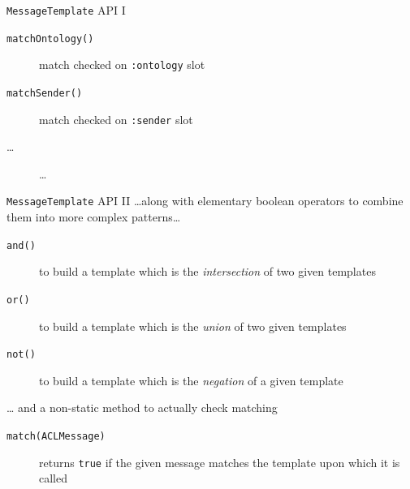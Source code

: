 \documentclass{beamer}\mode<presentation>{\usetheme{AMSCesenaPurpleAndGold}}
\begin{document}
\begin{frame}[c,allowframebreaks]
\begin{block}{\texttt{MessageTemplate} API I}
\begin{description}
            \item[\texttt{matchOntology()}] match checked on \texttt{:ontology} slot
            \item[\texttt{matchSender()}] match checked on \texttt{:sender} slot
            \item[\ldots] \ldots
        \end{description}
    \end{block}
    \begin{block}{\texttt{MessageTemplate} API II}
        \ldots along with elementary boolean operators to combine them into more complex patterns\ldots
        \begin{description}
            \item[\texttt{and()}] to build a template which is the \emph{intersection} of two given templates
            \item[\texttt{or()}] to build a template which is the \emph{union} of two given templates
            \item[\texttt{not()}] to build a template which is the \emph{negation} of a given template
        \end{description}
        \ldots{} and a non-static method to actually check matching
        \begin{description}
            \item[\texttt{match(ACLMessage)}] returns \texttt{true} if the given message matches the template upon which it is called
        \end{description}
    \end{block}
\end{frame}
\end{document}
